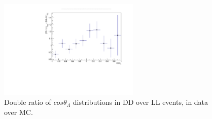 \begin{figure}[h!]
\centering
\includegraphics[width=0.6\textwidth]{Lmumu/figs/DD_Over_LL_MC_Over_Data_cosThetaB.pdf}
\caption{Double ratio of $cos \theta_\Lambda$ distributions in DD over LL events, in data over MC.}
\end{figure}







